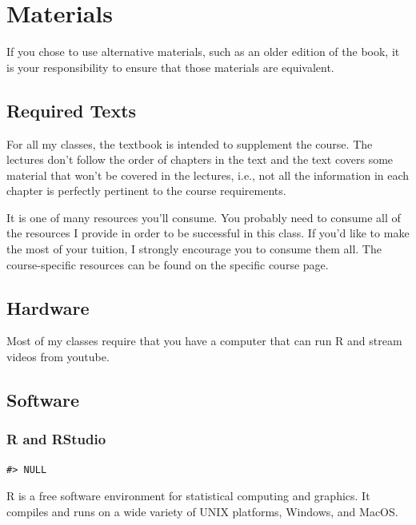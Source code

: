 \hypertarget{materials}{%
\section{Materials}\label{materials}}

If you chose to use alternative materials, such as an older edition of the book, it is your responsibility to ensure that those materials are equivalent.

\hypertarget{required-texts}{%
\subsection{Required Texts}\label{required-texts}}

For all my classes, the textbook is intended to supplement the course.
The lectures don't follow the order of chapters in the text and the text covers some material that won't be covered in the lectures, i.e., not all the information in each chapter is perfectly pertinent to the course requirements.

It is one of many resources you'll consume.
You probably need to consume all of the resources I provide in order to be successful in this class.
If you'd like to make the most of your tuition, I strongly encourage you to consume them all.
The course-specific resources can be found on the specific course page.

\hypertarget{hardware}{%
\subsection{Hardware}\label{hardware}}

Most of my classes require that you have a computer that can run R and stream videos from youtube.

\hypertarget{software}{%
\subsection{Software}\label{software}}

\hypertarget{r-and-rstudio}{%
\subsubsection{R and RStudio}\label{r-and-rstudio}}

\begin{verbatim}
#> NULL
\end{verbatim}

R is a free software environment for statistical computing and graphics. It compiles and runs on a wide variety of UNIX platforms, Windows, and MacOS.

